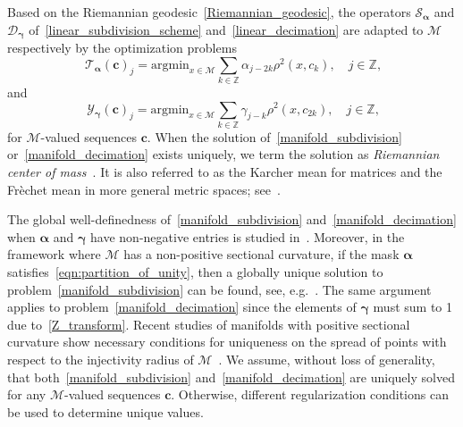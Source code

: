 \documentclass[12pt]{article}
\begin{document}
Based on the Riemannian geodesic~\eqref{Riemannian_geodesic}, the operators $\mathcal{S}_{\boldsymbol{\alpha}}$ and $\mathcal{D}_{\boldsymbol{\gamma}}$ of~\eqref{linear_subdivision_scheme} and~\eqref{linear_decimation} are adapted to $\mathcal{M}$ respectively by the optimization problems
\begin{equation}~\label{manifold_subdivision}
    \mathcal{T}_{\boldsymbol{\alpha}}(\boldsymbol{c})_j = \text{argmin}_{x\in\mathcal{M}}\sum_{k\in\mathbb{Z}}\alpha_{j-2k}\rho^2(x,c_k), \quad j\in\mathbb{Z},
\end{equation}
and
\begin{equation}~\label{manifold_decimation}
    \mathcal{Y}_{\boldsymbol{\gamma}}(\boldsymbol{c})_j = \text{argmin}_{x\in\mathcal{M}}\sum_{k\in\mathbb{Z}}\gamma_{j-k}\rho^2(x,c_{2k}),\quad j\in\mathbb{Z}, 
\end{equation}
for $\mathcal{M}$-valued sequences $\boldsymbol{c}$. When the solution of~\eqref{manifold_subdivision} or~\eqref{manifold_decimation} exists uniquely, we term the solution as \emph{Riemannian center of mass}~\cite{grove1973conjugate}. It is also referred to as the Karcher mean for matrices and the Frèchet mean in more general metric spaces; see~\cite{karcher2014riemannian}.

The global well-definedness of~\eqref{manifold_subdivision} and~\eqref{manifold_decimation} when $\boldsymbol{\alpha}$ and $\boldsymbol{\gamma}$ have non-negative entries is studied in~\cite{kobayashi1996foundations}. Moreover, in the framework where $\mathcal{M}$ has a non-positive sectional curvature, if the mask $\boldsymbol{\alpha}$ satisfies~\eqref{eqn:partition_of_unity}, then a globally unique solution to problem~\eqref{manifold_subdivision} can be found, see, e.g.~\cite{karcher1977riemannian, hardering2015intrinsic, sander2016geodesic}. The same argument applies to problem~\eqref{manifold_decimation} since the elements of $\boldsymbol{\gamma}$ must sum to 1 due to~\eqref{Z_transform}. Recent studies of manifolds with positive sectional curvature show necessary conditions for uniqueness on the spread of points with respect to the injectivity radius of $\mathcal{M}$~\cite{dyer2016barycentric, huning2022convergence}. We assume, without loss of generality, that both~\eqref{manifold_subdivision} and~\eqref{manifold_decimation} are uniquely solved for any $\mathcal{M}$-valued sequences $\boldsymbol{c}$. Otherwise, different regularization conditions can be used to determine unique values.
\end{document}
